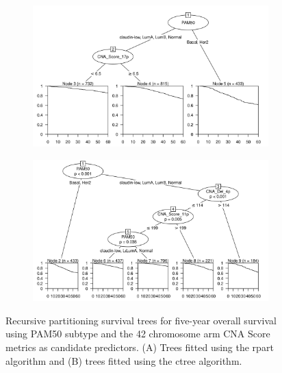 \begin{figure}[!htb]
\centering

\vspace{0.5cm}

\begin{subfigure}{\textwidth}
\subcaption{}
\includegraphics[width=1\textwidth]{../figures/Appendices/Appendix_B/PA_PartyKit_Survival_Score_FiveYearOS_PAM50.png}
\end{subfigure}

\vspace{2cm}

\begin{subfigure}{\textwidth}
\subcaption{}
\includegraphics[width=1\textwidth]{../figures/Appendices/Appendix_B/PA_Ctree_Survival_Score_FiveYearOS_PAM50.png}
\end{subfigure}

\vspace{0.5cm}

\caption[Recursive partitioning survival trees for five-year overall survival using PAM50 subtype and the 42 chromosome arm CNA Score metrics as candidate predictors.]{Recursive partitioning survival trees for five-year overall survival using PAM50 subtype and the 42 chromosome arm CNA Score metrics as candidate predictors. (A) Trees fitted using the rpart algorithm and (B) trees fitted using the ctree algorithm.}
\end{figure}


